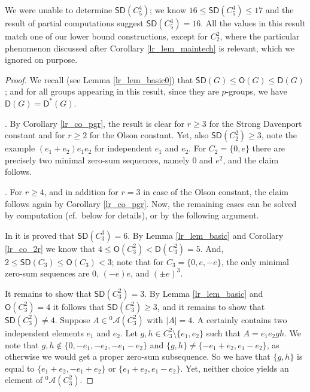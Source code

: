 \documentclass{amsart}
\theoremstyle{definition}
\numberwithin{equation}{section}
\begin{document}
We were unable to determine ${\mathsf{SD}}(C_5^4)$; we know $16 \le {\mathsf{SD}}(C_5^4) \le 17$ and the result of partial computations suggest ${\mathsf{SD}}(C_5^4)=16$. All the values in this result match one of our lower bound constructions,
except for $C_2^2$, where the particular phenomenon discussed after Corollary \ref{lr_lem_maintech} is relevant,
which we ignored on purpose.

\begin{proof}
We recall (see Lemma \ref{lr_lem_basic0}) that ${\mathsf{SD}}(G)\le {\mathsf{O}}(G)\le {\mathsf{D}}(G)$;
and for all groups appearing in this result, since they are $p$-groups,
 we have ${\mathsf{D}}(G)={\mathsf{D}^{\ast}}(G)$.

. By Corollary \ref{lr_co_pgr}, the result is clear for $r\ge 3$ for the Strong Davenport constant and for $r \ge 2$ for the Olson constant. Yet, also ${\mathsf{SD}}(C_2^2)\ge 3$, note the example $(e_1+e_2)e_1e_2$ for independent $e_1$ and $e_2$. For $C_2=\{0,e\}$ there are precisely two minimal zero-sum sequences, namely $0$ and $e^2$, and the claim follows.

. For $r \ge 4$, and in addition for
$r=3$ in case of the Olson constant, the claim follows again by Corollary \ref{lr_co_pgr}.
Now, the remaining cases can be solved by computation (cf.~below for details), or by the following argument.

In \cite{GGS} it is proved that ${\mathsf{SD}}(C_3^3)=6$. By Lemma \ref{lr_lem_basic} and Corollary \ref{lr_co_2r} we know that $4 \le {\mathsf{O}}(C_3^2)< {\mathsf{D}}(C_3^2)=5$. And, $2\le {\mathsf{SD}}(C_3)\le {\mathsf{O}}(C_3)< 3$; note that for $C_3= \{0,e,-e\}$,
the only minimal zero-sum sequences are $0$, $(-e)e$, and $(\pm e)^3$.

It remains to show that ${\mathsf{SD}}(C_3^2)=3$.
By Lemma \ref{lr_lem_basic} and ${\mathsf{O}}(C_3^2) = 4$ it follows that ${\mathsf{SD}}(C_3^2) \ge 3$, and it remains to show that ${\mathsf{SD}}(C_3^2)\neq 4$.
Suppose $A\in {{}^{{0}}\!\mathcal{A}}(C_3^2)$ with $|A|=4$. A certainly contains two independent elements $e_1$ and $e_2$.
Let $g, h\in C_3^2\setminus \{e_1,e_2\}$ such that $A=e_1e_2gh$. We note that $g,h\notin  \{0, -e_1, -e_2, -e_1-e_2\}$ and $\{g,h\} \neq \{- e_1 + e_2, e_1 - e_2\}$, as otherwise we would get a proper zero-sum subsequence.
So we have that $\{g,h\}$ is equal to $\{e_1+e_2, -e_1 + e_2\}$ or  $\{e_1+e_2,e_1 - e_2\}$.
Yet, neither choice yields an element of ${{}^{{0}}\!\mathcal{A}}(C_3^2)$.


\end{proof}
\end{document}

